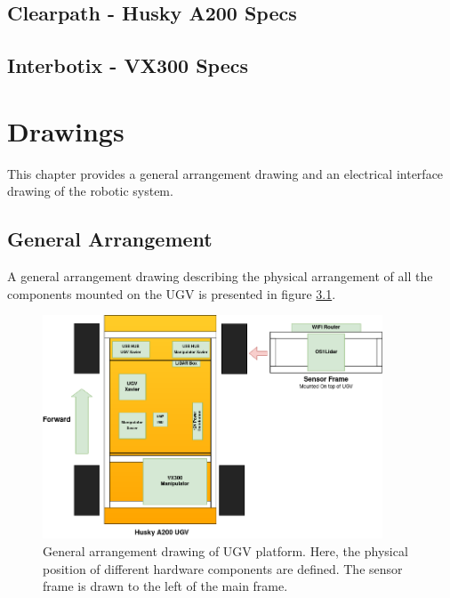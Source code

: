 \section{Clearpath - Husky A200 Specs} 


\section{Interbotix - VX300 Specs}



\chapter{Drawings}
This chapter provides a general arrangement drawing and an electrical interface drawing of the robotic system.
\section{General Arrangement}\label{A:D:GeneralArrangement}
A general arrangement drawing describing the physical arrangement of all the components mounted on the UGV is presented in figure \ref{fig:general_arrangement}.

\begin{figure}[htp]
  \centering
   \includegraphics[width=0.9\textwidth]{Figures/general_arrangement.drawio.png}
  \caption{General arrangement drawing of UGV platform. Here, the physical position of different hardware components are defined. The sensor frame is drawn to the left of the main frame.}
  \label{fig:general_arrangement}
\end{figure}

